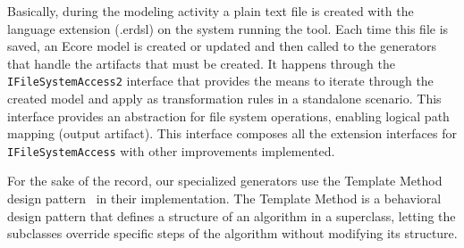 Basically, during the modeling activity a plain text file is created with the language extension (.erdsl) on the system running the tool.
Each time this file is saved, an Ecore model is created or updated and then called to the generators that handle the artifacts that must be created.
It happens through the \texttt {IFileSystemAccess2} interface that provides the means to iterate through the created model and apply as transformation rules in a standalone scenario.
This interface provides an abstraction for file system operations, enabling logical path mapping (output artifact).
This interface composes all the extension interfaces for \texttt {IFileSystemAccess} with other improvements implemented.

For the sake of the record, our specialized generators use the Template Method design pattern~\cite{GOF:95} in their implementation.
The Template Method is a behavioral design pattern that defines a structure of an algorithm in a superclass, letting the subclasses override specific steps of the algorithm without modifying its structure.

